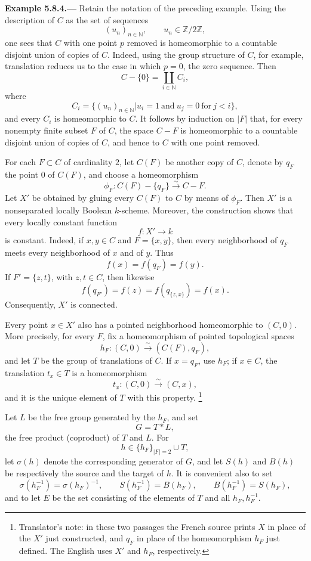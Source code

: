 
\medskip
{}\label{ex:sga3-VIB-5.8.4}%
\noindent\textbf{Example 5.8.4.---}
Retain the notation of the preceding example. Using the
description of \(C\) as the set of sequences
\[
  (u_n)_{n\in\mathbb N},
  \qquad u_n\in\mathbb Z/2\mathbb Z,
\]
one sees that \(C\) with one point \(p\) removed is homeomorphic
to a countable disjoint union of copies of \(C\). Indeed, using
the group structure of \(C\), for example, translation reduces us
to the case in which \(p=0\), the zero sequence. Then
\[
  C-\{0\}=\coprod_{i\in\mathbb N}C_i,
\]
where
\[
  C_i=
  \bigl\{(u_n)_{n\in\mathbb N}\mathrel{\big|}
    u_i=1\ \text{and}\ u_j=0\ \text{for}\ j<i\bigr\},
\]
and every \(C_i\) is homeomorphic to \(C\). It follows by
induction on \(\lvert F\rvert\) that, for every nonempty finite
subset \(F\) of \(C\), the space \(C-F\) is homeomorphic to a
countable disjoint union of copies of \(C\), and hence to \(C\)
with one point removed.

For each \(F\subset C\) of cardinality \(2\), let \(C(F)\) be
another copy of \(C\), denote by \(q_F\) the point \(0\) of
\(C(F)\), and choose a homeomorphism
\[
  \phi_F:C(F)-\{q_F\}\xrightarrow{\sim}C-F.
\]
Let \(X'\) be obtained by gluing every \(C(F)\) to \(C\) by means
of \(\phi_F\). Then \(X'\) is a nonseparated locally Boolean
\(k\)-scheme. Moreover, the construction shows that every locally
constant function
\[
  f:X'\longrightarrow k
\]
is constant. Indeed, if \(x,y\in C\) and \(F=\{x,y\}\), then every
neighborhood of \(q_F\) meets every neighborhood of \(x\) and of
\(y\). Thus
\[
  f(x)=f(q_F)=f(y).
\]
If \(F'=\{z,t\}\), with \(z,t\in C\), then likewise
\[
  f(q_{F'})=f(z)=f(q_{\{z,x\}})=f(x).
\]
Consequently, \(X'\) is connected.

Every point \(x\in X'\) also has a pointed neighborhood
homeomorphic to \((C,0)\). More precisely, for every \(F\), fix a
homeomorphism of pointed topological spaces
\[
  h_F:(C,0)\xrightarrow{\sim}(C(F),q_F),
\]
and let \(T\) be the group of translations of \(C\). If
\(x=q_F\), use \(h_F\); if \(x\in C\), the translation
\(t_x\in T\) is a homeomorphism
\[
  t_x:(C,0)\xrightarrow{\sim}(C,x),
\]
and it is the unique element of \(T\) with this property.%
\footnote[1]{\label{note:sga3-VIB-5.8.4-Xprime-hF}Translator's
note: in these two passages the French source prints \(X\) in
place of the \(X'\) just constructed, and \(q_F\) in place of the
homeomorphism \(h_F\) just defined. The English uses \(X'\) and
\(h_F\), respectively.}

Let \(L\) be the free group generated by the \(h_F\), and set
\[
  G=T*L,
\]
the free product (coproduct) of \(T\) and \(L\). For
\[
  h\in\{h_F\}_{\lvert F\rvert=2}\cup T,
\]
let \(\sigma(h)\) denote the corresponding generator of \(G\),
and let \(S(h)\) and \(B(h)\) be respectively the source and the
target of \(h\). It is convenient also to set
\[
  \sigma(h_F^{-1})=\sigma(h_F)^{-1},\qquad
  S(h_F^{-1})=B(h_F),\qquad
  B(h_F^{-1})=S(h_F),
\]
and to let \(E\) be the set consisting of the elements of \(T\)
and all \(h_F,h_F^{-1}\).

